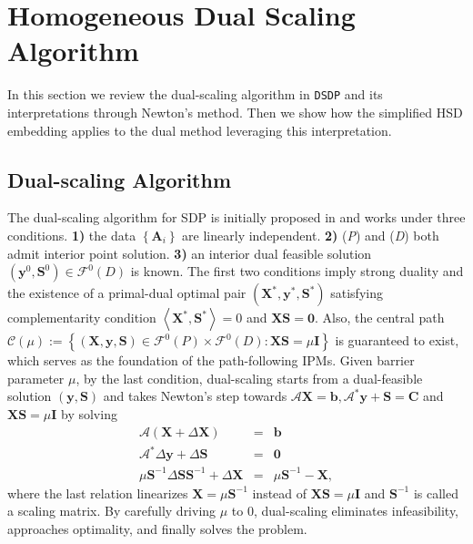 \section{Homogeneous Dual Scaling Algorithm }\label{sec3}

In this section we review the dual-scaling algorithm in
{{\texttt{DSDP}}} and its interpretations through Newton's method. Then
we show how the simplified HSD embedding applies to the dual method leveraging 
this interpretation.

\subsection{Dual-scaling Algorithm}

The dual-scaling algorithm for SDP is initially proposed in
{\cite{benson1999mixed}} and works under three conditions. {\textbf{1)}} the
 data $\left\{ \mathbf{A}_i \right\}$ are linearly independent.
{\textbf{2)}} ({{\em P\/}}) and ({{\em D\/}}) both admit interior point
solution. {\textbf{3)}} an interior dual feasible solution $\left( \mathbf{y}^0,
\mathbf{S}^0 \right) \in \mathcal{F}^0 (D)$ is known. The first two conditions imply
strong duality and the existence of a primal-dual optimal pair $\left(
\mathbf{X}^{\ast}, \mathbf{y}^{\ast}, \mathbf{S}^{\ast} \right)$ satisfying complementarity condition
$\left\langle \mathbf{X}^{\ast}, \mathbf{S}^{\ast} \right\rangle = 0$ and $\mathbf{X} \mathbf{S} = \textbf{0}$.
Also, the central path $\mathcal{C} (\mu) :=
\left\{ \left( \mathbf{X}, \mathbf{y}, \mathbf{S} \right) \in \mathcal{F}^0 (P) \times \mathcal{F}^0
(D) : \mathbf{X} \mathbf{S} = \mu \mathbf{I} \right\}$ is guaranteed to exist,  which serves as the foundation of the
path-following IPMs. Given barrier parameter $\mu$, by the last condition, 
dual-scaling starts from a dual-feasible solution
$\left( \mathbf{y}, \mathbf{S} \right)$ and takes Newton's step towards $\mathcal{A} \mathbf{X} = \mathbf{b},
\mathcal{A}^{\ast} \mathbf{y} + \mathbf{S} = \mathbf{C}$ and $\mathbf{X} \mathbf{S} = \mu \mathbf{I}$ by solving
\begin{eqnarray}\label{dsdpnewton}
  \mathcal{A} \left( \mathbf{X} + \Delta \mathbf{X} \right) & = & \mathbf{b} \nonumber \\
  \mathcal{A}^{\ast} \Delta \mathbf{y} + \Delta \mathbf{S} & = & \textbf{0} \\
  \mu \mathbf{S}^{- 1} \Delta \mathbf{S} \mathbf{S}^{- 1} + \Delta \mathbf{X} & = & \mu \mathbf{S}^{- 1} - \mathbf{X} \nonumber, 
\end{eqnarray}
where the last relation linearizes $\mathbf{X} = \mu \mathbf{S}^{- 1}$ instead of $\mathbf{X} \mathbf{S} =
\mu \mathbf{I}$ and $\mathbf{S}^{- 1}$ is called a scaling matrix. 
By carefully driving $\mu$ to 0, dual-scaling eliminates infeasibility, approaches optimality, and finally solves the problem.

